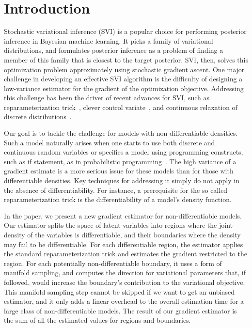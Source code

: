 
\section{Introduction}
Stochastic variational inference (SVI) is a popular choice for performing posterior inference in Bayesian machine learning. It picks a family of variational distributions, and formulates posterior inference as a problem of finding a member of this family that is closest to the target posterior. SVI, then, solves this optimization problem approximately using stochastic gradient ascent. One major challenge in developing an effective SVI algorithm is the difficulty of designing a low-variance estimator for the gradient of the optimization objective. Addressing this challenge has been the driver of recent advances for SVI, such as reparameterization trick~\cite{KingmaICLR14,RezendeICML14,RuizNIPS16,NaessethAISTATS17,KucukelbirJMLR2017}, clever control variate~\cite{RanganathAISTATS14,GuICLR16,GuICLR17,TuckerNIPS17,GrathwohlICLR18,MillerReparam2017}, and continuous relaxation of discrete distributions~\cite{MaddisonICLR17,JangICLR17}. 


Our goal is to tackle the challenge for models with non-differentiable densities. Such a model naturally arises when one starts to use both discrete and continuous random variables or specifies a model using programming constructs, such as if statement, as in probabilistic programming~\cite{GoodmanUAI08,Veture14,WoodAISTATS14,GordonICSE14}. The high variance of a gradient estimate is a more serious issue for these models than for those with differentiable densities. Key techniques for addressing it simply do not apply in the absence of differentiability. For instance, a prerequisite for the so called reparameterization trick is the differentiability of a model's density function. 

In the paper, we present a new gradient estimator for non-differentiable models. Our estimator splits the space of latent variables into regions where the joint density of the variables is differentiable, and their boundaries where the density may fail to be differentiable. For each differentiable region, the estimator applies the standard reparameterization trick and estimates the gradient restricted to the region. For each potentially non-differentiable boundary, it uses a form of manifold sampling, and computes the direction for variational parameters that, if followed, would increase the boundary's contribution to the variational objective. This manifold sampling step cannot be skipped if we want to get an unbiased estimator, and it only adds a linear overhead to the overall estimation time for a large class of non-differentiable models. The result of our gradient estimator is the sum of all the estimated values for regions and boundaries.

